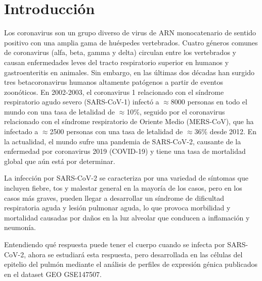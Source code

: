 \section{Introducción}
Los coronavirus son un grupo diverso de virus de ARN monocatenario de sentido positivo con una amplia gama de huéspedes vertebrados. Cuatro géneros comunes de coronavirus (alfa, beta, gamma y delta) circulan entre los vertebrados y causan enfermedades leves del tracto respiratorio superior en humanos y gastroenteritis en animales. Sin embargo, en las últimas dos décadas han surgido tres betacoronavirus humanos altamente patógenos a partir de eventos zoonóticos. En 2002-2003, el coronavirus 1 relacionado con el síndrome respiratorio agudo severo (SARS-CoV-1) infectó a $\approx$8000 personas en todo el mundo con una tasa de letalidad de $\approx$10\%, seguido por el coronavirus relacionado con el síndrome respiratorio de Oriente Medio (MERS-CoV), que ha infectado a $\approx$2500 personas con una tasa de letalidad de $\approx$36\% desde 2012. En la actualidad, el mundo sufre una pandemia de SARS-CoV-2, causante de la enfermedad por coronavirus 2019 (COVID-19) y tiene una tasa de mortalidad global que aún está por determinar.

La infección por SARS-CoV-2 se caracteriza por una variedad de síntomas que incluyen fiebre, tos y malestar general en la mayoría de los casos, pero en los casos más graves, pueden llegar a desarrollar un síndrome de dificultad respiratoria aguda y lesión pulmonar aguda, lo que provoca morbilidad y mortalidad causadas por daños en la luz alveolar que conducen a inflamación y neumonía.

Entendiendo qué respuesta puede tener el cuerpo cuando se infecta por SARS-CoV-2, ahora se estudiará esta respuesta, pero desarrollada en las células del epitelio del pulmón mediante el análisis de perfiles de expresión génica publicados en el dataset GEO GSE147507.